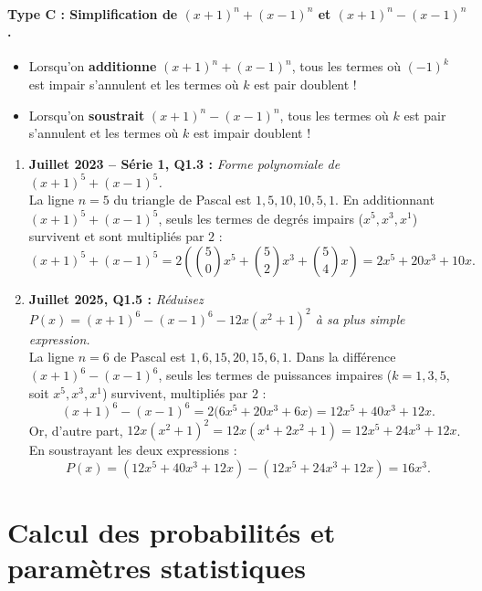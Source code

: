 \begin{exemple}
\paragraph{Type C : Simplification de $(x + 1)^n + (x - 1)^n$ et $(x + 1)^n - (x - 1)^n$.}
\begin{itemize}
    \item Lorsqu'on \textbf{additionne} $(x + 1)^n + (x - 1)^n$, tous les termes où $(-1)^k$ est impair s'annulent et les termes où $k$ est pair doublent !
    \item Lorsqu'on \textbf{soustrait} $(x + 1)^n - (x - 1)^n$, tous les termes où $k$ est pair s'annulent et les termes où $k$ est impair doublent !
\end{itemize}
\begin{enumerate}[resume]
    \item \textbf{Juillet 2023 -- Série 1, Q1.3 :} \emph{Forme polynomiale de $(x + 1)^5 + (x - 1)^5$.}\\
    La ligne $n = 5$ du triangle de Pascal est $1, 5, 10, 10, 5, 1$. En additionnant $(x+1)^5 + (x-1)^5$, seuls les termes de degrés impairs ($x^5, x^3, x^1$) survivent et sont multipliés par $2$ :
    \[
        (x + 1)^5 + (x - 1)^5 = 2\left(\binom{5}{0}x^5 + \binom{5}{2}x^3 + \binom{5}{4}x\right) = \boxed{2x^5 + 20x^3 + 10x}.
    \]
    \item \textbf{Juillet 2025, Q1.5 :} \emph{Réduisez $P(x) = (x + 1)^6 - (x - 1)^6 - 12x(x^2 + 1)^2$ à sa plus simple expression.}\\
    La ligne $n = 6$ de Pascal est $1, 6, 15, 20, 15, 6, 1$. Dans la différence $(x + 1)^6 - (x - 1)^6$, seuls les termes de puissances impaires ($k = 1, 3, 5$, soit $x^5, x^3, x^1$) survivent, multipliés par $2$ :
    \[
        (x + 1)^6 - (x - 1)^6 = 2\bigl(6x^5 + 20x^3 + 6x\bigr) = 12x^5 + 40x^3 + 12x.
    \]
    Or, d'autre part, $12x(x^2 + 1)^2 = 12x(x^4 + 2x^2 + 1) = 12x^5 + 24x^3 + 12x$. En soustrayant les deux expressions :
    \[
        P(x) = (12x^5 + 40x^3 + 12x) - (12x^5 + 24x^3 + 12x) = \boxed{16x^3}.
    \]
\end{enumerate}
\end{exemple}

\section{Calcul des probabilités et paramètres statistiques}


